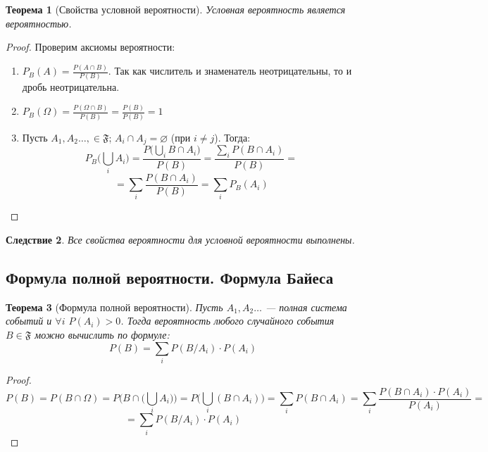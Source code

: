 \documentclass[11pt,openany,a4paper]{scrartcl}
\theoremstyle{plain}
\newtheorem{theorem}{Теорема}[subsection]
\newtheorem{corollary}[theorem]{Следствие}
\theoremstyle{definition}
\begin{document}
\begin{theorem}[Свойства условной вероятности]
    Условная вероятность является вероятностью.
\end{theorem}
\begin{proof}
    Проверим аксиомы вероятности:
    \begin{enumerate}
        \item $P_B(A) =  \frac{P(A \cap B)}{P(B)}$. Так как числитель и знаменатель 
        неотрицательны, то и дробь неотрицательна.
        \item $P_B(\Omega) = \frac{P(\Omega \cap B)}{P(B)} =  \frac{P(B)}{P(B)} = 1$
        \item Пусть $A_1, A_2 \ldots, \in \mathfrak{F}$;
        $A_i \cap A_j = \varnothing$ (при $i \neq j$). Тогда:
        $$
        P_B\bigg(\bigcup\limits_i A_i\bigg) =
        \frac{P\Big(\bigcup\limits_i B\cap A_i\Big)}{P(B)} =
        \frac{\sum\limits_i P(B \cap A_i)}{P(B)} =
        $$
        $$
        = \sum\limits_i \frac{P(B\cap A_i)}{P(B)} = \sum\limits_i P_B(A_i)
        $$
    \end{enumerate}
\end{proof}
\begin{corollary}
    Все свойства вероятности для условной вероятности выполнены.
\end{corollary}

\subsection{Формула полной вероятности. Формула Байеса}
\begin{theorem}[Формула полной вероятности]
    Пусть $A_1, A_2 \ldots$ — полная система событий и $\forall i$ $P(A_i) > 0$. Тогда
    вероятность любого случайного события $B \in \mathfrak{F}$ можно вычислить
    по формуле:
    $$
    P(B) = \sum_i P(B/A_i) \cdot P(A_i)
    $$
\end{theorem}
\begin{proof}
    $$
    P(B) = P(B \cap \Omega) = P\Bigg(B \cap \bigg(\bigcup_i A_i\bigg)\Bigg) =
    P\bigg(\bigcup_i (B \cap A_i)\bigg) =
    \sum_i P(B \cap A_i) = \sum_i\frac{P(B \cap A_i) \cdot P(A_i)}{P(A_i)} =
    $$
    $$
    = \sum_i P(B/A_i) \cdot P(A_i)
    $$
\end{proof}
\end{document}
